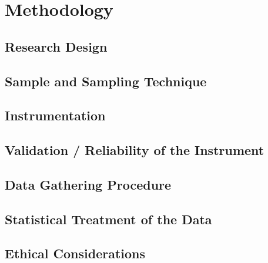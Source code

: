 \documentclass[../main]{subfiles}
\begin{document}
\chapter{Methodology}

\section{Research Design}

\section{Sample and Sampling Technique}

\section{Instrumentation}

\section{Validation / Reliability of the Instrument}

\section{Data Gathering Procedure}

\section{Statistical Treatment of the Data}

\section{Ethical Considerations}
\end{document}
